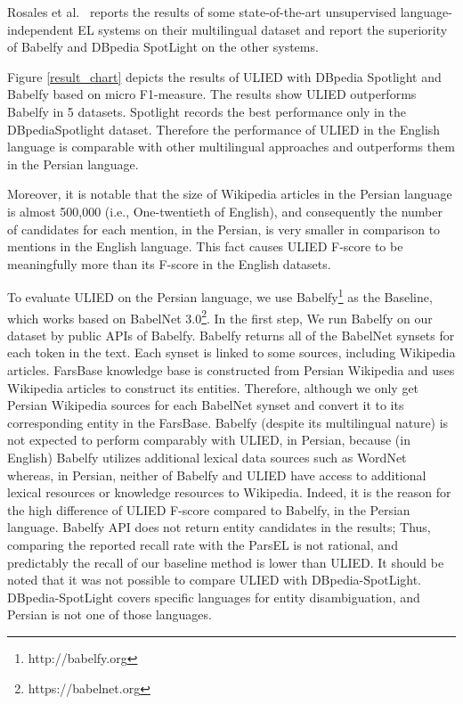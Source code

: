 \documentclass{article}
\begin{document}
Rosales et al.~\cite{rosales2018voxel} reports the results of some state-of-the-art unsupervised language-independent EL systems on their multilingual dataset and report the superiority of Babelfy and DBpedia SpotLight on the other systems.

Figure \ref{result_chart} depicts the results of ULIED with DBpedia Spotlight and Babelfy based on micro F1-measure. The results show ULIED outperforms Babelfy in 5 datasets. Spotlight records the best performance only in the DBpediaSpotlight dataset. Therefore the performance of ULIED in the English language is comparable with other multilingual approaches and outperforms them in the Persian language.

Moreover, it is notable that the size of Wikipedia articles in the Persian language is almost 500,000 (i.e., One-twentieth of English), and consequently the number of candidates for each mention, in the Persian, is very smaller in comparison to mentions in the English language. This fact causes ULIED F-score to be meaningfully more than its F-score in the English datasets.

To evaluate ULIED on the Persian language, we use Babelfy\footnote{ http://babelfy.org } as the Baseline, which works based on BabelNet 3.0\footnote{ https://babelnet.org }. In the first step, We run Babelfy on our dataset by public APIs of Babelfy. Babelfy returns all of the BabelNet synsets for each token in the text. Each synset is linked to some sources, including Wikipedia articles. FarsBase knowledge base is constructed from Persian Wikipedia and uses Wikipedia articles to construct its entities. Therefore, although we only get Persian Wikipedia sources for each BabelNet synset and convert it to its corresponding entity in the FarsBase.
Babelfy (despite its multilingual nature) is not expected to perform comparably with ULIED, in Persian, because (in English) Babelfy utilizes additional lexical data sources such as WordNet whereas, in Persian, neither of Babelfy and ULIED have access to additional lexical resources or knowledge resources to Wikipedia. Indeed, it is the reason for the high difference of ULIED F-score compared to Babelfy, in the Persian language. Babelfy API does not return entity candidates in the results; Thus, comparing the reported recall rate with the ParsEL is not rational, and predictably the recall of our baseline method is lower than ULIED.
It should be noted that it was not possible to compare ULIED with DBpedia-SpotLight. DBpedia-SpotLight covers specific languages for entity disambiguation, and Persian is not one of those languages.
\end{document}
